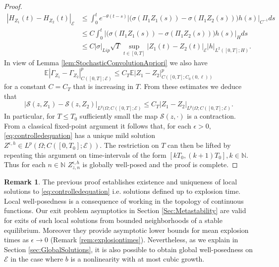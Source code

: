 \documentclass[10pt, reqno]{amsart}
\newcommand{\N}{\mathbb{N}}
\newcommand{\ex}{\mathbb{E}}
\newcommand{\e}{\mathcal{E}}
\theoremstyle{definition}
\newtheorem{rem}{Remark}
\numberwithin{lem}{section}
\numberwithin{cor}{section}
\numberwithin{prop}{section}
\numberwithin{thm}{section}
\numberwithin{dfn}{section}
\begin{document}
\begin{proof}
 
 \begin{equation*}
 	\begin{aligned}
 			|H_{Z_1}(t)-H_{Z_2}(t)|_\e&\leq
 		\int_0^t e^{-\theta (t-s)} \big|\big(\sigma(\Pi_1 Z_1(s))- \sigma(\Pi_1 Z_2(s))\big)h(s)\big|_{C^{-1}}ds\\&
 		\leq C \int_0^t \big|\big(\sigma(\Pi_1 Z_1(s))- \sigma(\Pi_1 Z_2(s))\big)h(s)\big|_{H}ds\\&
 		\leq  C|\sigma|_{Lip} \sqrt{T}\sup_{t\in[0,T]}|Z_1(t)-Z_2(t)|_{\e}|h|_{L^2([0,T];H)}.
 	\end{aligned}
 \end{equation*}
 In view of Lemma \ref{lem:StochasticConvolutionApriori} we also have 
 $$  \ex| \Gamma_{Z_1}-\Gamma_{Z_2}|_{C([0,T];\e)}^p\leq C_T\ex|Z_1-Z_2|^p_{ C([0,T];C_0(0,\ell))}   $$
 for a constant $C=C_T$ that is increasing in $T.$ From these estimates we deduce that 
 $$\big| \mathscr{S}(z, Z_1)-\mathscr{S}(z, Z_2)\big|_{ L^p(\Omega;     C([0,T]; \e)}    \leq C_T| Z_1-Z_2|_{ L^p(\Omega;     C([0,T]; \e)} .$$
In particular, for $T\leq T_0$ sufficiently small the map $\mathscr{S}(z,\cdot)$ is a contraction. From a classical fixed-point argument it follows that, for each $\epsilon>0,$ \eqref{eq:controlledequation} has a unique mild solution  $Z^{\epsilon,h}\in L^p(\Omega;     C([0,T_0]; \e)).$ The restriction on $T$ can then be lifted by repeating this argument on time-intervals of the form $[kT_0,  (k+1)T_0], k\in\N$. Thus for each $n\in\N$ $Z^{\epsilon, h}_{z,n}$ is globally well-posed and the proof is complete.
    	   \end{proof}

        


           \begin{rem}\label{rem:LocalSolutions} The previous proof establishes existence and uniqueness of local solutions to \eqref{eq:controlledequation} i.e. solutions defined up to explosion time. Local well-posedness is a consequence of working in the topology of continuous functions. Our exit problem asymptotics in Section \ref{Sec:Metastability} are valid for exits of such local solutions from bounded neighborhoods of a stable equilibrium. Moreover they provide asymptotic lower bounds for mean explosion times as $\epsilon\to 0$  (Remark \ref{rem:explosiontimes}). Nevertheless,
           as we explain in Section \ref{sec:GlobalSolutions}, it is also possible to obtain global well-posedness on $\e$ in the case where $b$ is a nonlinearity with at most cubic growth.
           \end{rem}
    	   
\end{document}
